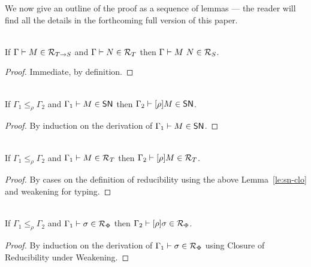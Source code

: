 We now give an outline of the proof as a sequence of lemmas --- the
reader will find all the details in the forthcoming full version of this paper.

\begin{lemma}\mbox{}\\
If $\Gamma \vdash M\in \mathcal{R}_{T \rightarrow S} $
and $\Gamma \vdash N\in \mathcal{R}_{T} $
then $\Gamma \vdash M~N\in \mathcal{R}_{S} $.
\end{lemma}
\begin{proof}
  Immediate, by definition.
\end{proof}

\begin{lemma}
\label{le:sn-clo}\mbox{} \\
If $\Gamma_1\leq_\rho \Gamma_2$ %
 and $\Gamma_1 \vdash M \in \mathsf{SN}$ 
then $\Gamma_2 \vdash [\rho]M \in \mathsf{SN}$. 
\end{lemma}
\begin{proof}
By induction on the derivation of $\Gamma_1 \vdash M \in \mathsf{SN}$.  
\end{proof}

\begin{lemma}\mbox{} \\
If $\Gamma_1 \leq_\rho \Gamma_2$ and 
 $\Gamma_1 \vdash M\in \mathcal{R}_{T} $ then $\Gamma_2 \vdash [\rho]M\in \mathcal{R}_{T} $. 
\end{lemma}
\begin{proof}
  By cases on the definition of reducibility using the above
  Lemma~\ref{le:sn-clo} and weakening for typing.
\end{proof}

\begin{lemma}\label{lem:weakredsub}\mbox{} \\
If $\Gamma_1 \leq_\rho \Gamma_2$ and 
  $\Gamma_1 \vdash \sigma\in \mathcal{R}_{\Phi} $ 
then $\Gamma_2 \vdash [\rho]\sigma\in \mathcal{R}_{\Phi} $.
\end{lemma}
\begin{proof}
  By induction on the derivation of $\Gamma_1 \vdash \sigma\in \mathcal{R}_{\Phi} $
  using Closure of Reducibility under Weakening.
\end{proof}



